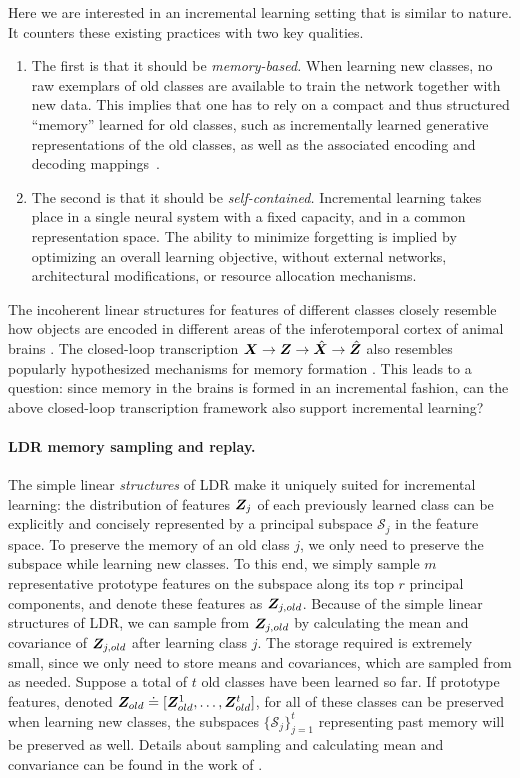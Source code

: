 \documentclass[\toplevelprefix/book-main.tex]{subfiles}
\begin{document}
Here we are interested in an incremental learning setting that is similar to nature. It  counters these existing practices with two key qualities. 
\begin{enumerate}
    \item The first is that it should be \emph{memory-based.} When learning new classes, no raw exemplars of old classes are available to train the network together with new data. This implies that one has to rely on a compact and thus structured ``memory'' learned for old classes, such as incrementally learned generative representations of the old classes, as well as the associated encoding and decoding mappings~\cite{fearnet}. 
    \item The second is that it should be \emph{self-contained.} Incremental learning takes place in a single neural system with a fixed capacity, and in a common representation space. The ability to minimize forgetting is implied by optimizing an overall learning objective, without external networks, architectural modifications, or resource allocation mechanisms.
\end{enumerate}

The incoherent linear structures for features of different classes closely resemble how objects are encoded in different areas of the inferotemporal cortex of animal brains \cite{Chang-Cell-2017,Bao2020AMO}. The closed-loop transcription $\bm{X} \rightarrow \bm{Z} \rightarrow \hat{\bm{X}} \rightarrow \hat{\bm{Z}}$ also resembles popularly hypothesized mechanisms for memory formation \cite{2020Vandeven,Josselyn2020MemoryER}. This leads to a question: since memory in the brains is formed in an incremental fashion, can the above closed-loop transcription framework also support incremental learning?

\paragraph{LDR memory sampling and replay.} The simple linear {\em structures} of LDR make it uniquely suited for incremental learning: the distribution of features $\bm{Z}_j$ of each previously learned class can be explicitly and concisely represented by a principal subspace $\mathcal{S}_j$ in the feature space. To preserve the memory of an old class $j$, we only need to preserve the subspace while learning new classes. To this end, we simply sample $m$ representative prototype features on the subspace along its top $r$ principal components, and denote these features as $\bm{Z}_{j,old}$. Because of the simple linear structures of LDR, we can sample from $\bm{Z}_{j,old}$ by calculating the mean and covariance of $\bm{Z}_{j,old}$ after learning class $j$. The storage required is extremely small, since we only need to store means and covariances, which are sampled from as needed. Suppose a total of $t$ old classes have been learned so far. If prototype features, denoted $\bm{Z}_{old} \doteq [\bm{Z}^1_{old},\ldots, \bm{Z}^t_{old}]$, for all of these classes can be preserved when learning new classes, the subspaces $\{\mathcal{S}_j\}_{j=1}^t$ representing past memory will be preserved as well. Details about sampling and calculating mean and convariance can be found in the work of \cite{tong2023incremental}.
\end{document}
